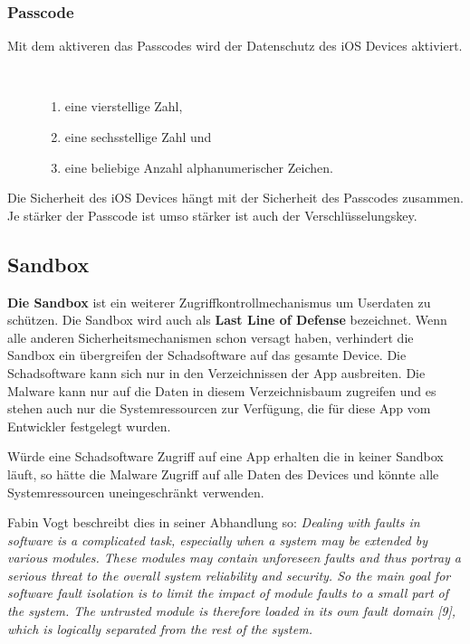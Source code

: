 \subsubsection{Passcode}
\label{sec:Passcode}

Mit dem aktiveren das Passcodes wird der Datenschutz des iOS Devices aktiviert. 
\begin{description}
    \item[\parbox{\textwidth} {Der User hat die Möglichkeit zwischen drei Einstellungsvarianten des Passcodes zu variieren}]~\par
   \begin{enumerate}
        \item eine vierstellige Zahl,
        \item eine sechsstellige Zahl und
        \item eine beliebige Anzahl alphanumerischer Zeichen.
    \end{enumerate}
\end{description} 

Die Sicherheit des iOS Devices hängt mit der Sicherheit des Passcodes zusammen. Je stärker der Passcode ist umso stärker ist auch der Verschlüsselungskey. 

\subsection{Sandbox}
\label{sec:Sandbox}

\textbf{Die Sandbox} ist ein weiterer Zugriffkontrollmechanismus um Userdaten zu schützen. Die Sandbox wird auch als \textbf{Last Line of Defense} bezeichnet. Wenn alle anderen Sicherheitsmechanismen schon versagt haben, verhindert die Sandbox ein übergreifen der Schadsoftware auf das gesamte Device. Die Schadsoftware kann sich nur in den Verzeichnissen der App ausbreiten. Die Malware kann nur auf die Daten in diesem Verzeichnisbaum zugreifen und es stehen auch nur die Systemressourcen zur Verfügung, die für diese App vom Entwickler festgelegt wurden. \par
Würde eine Schadsoftware Zugriff auf eine App erhalten die in keiner Sandbox läuft, so hätte die Malware Zugriff auf alle Daten des Devices und könnte alle Systemressourcen uneingeschränkt verwenden.\par
Fabin Vogt beschreibt dies in seiner Abhandlung so: \textit{\glqq Dealing with faults in software is a complicated task, especially when a system may be extended by various modules. These modules may contain unforeseen faults and thus portray a serious threat to the overall system reliability and security. So the main goal for software fault isolation is to limit the impact of module faults to a small part of the system. The untrusted module is therefore loaded in its own fault domain [9], which is logically separated from the rest of the system.\grqq{}} \cite{Sandbox[4]}

